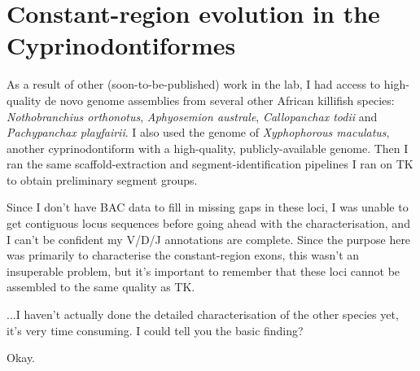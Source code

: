 \section{Constant-region evolution in the Cyprinodontiformes}


As a result of other (soon-to-be-published) work in the lab, I had access to high-quality de novo genome assemblies from several other African killifish species: \textit{Nothobranchius orthonotus}, \textit{Aphyosemion australe}, \textit{Callopanchax todii} and \textit{Pachypanchax playfairii}. I also used the genome of \textit{Xyphophorous maculatus}, another cyprinodontiform with a high-quality, publicly-available genome. Then I ran the same scaffold-extraction and segment-identification pipelines I ran on TK to obtain preliminary segment groups. 

Since I don't have BAC data to fill in missing gaps in these loci, I was unable to get contiguous locus sequences before going ahead with the characterisation, and I can't be confident my V/D/J annotations are complete. Since the purpose here was primarily to characterise the constant-region exons, this wasn't an insuperable problem, but it's important to remember that these loci cannot be assembled to the same quality as TK.


...I haven't actually done the detailed characterisation of the other species yet, it's very time consuming. I could tell you the basic finding?


Okay.



